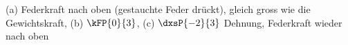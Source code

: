 (a) Federkraft nach oben (gestauchte Feder drückt), gleich gross wie die Gewichtskraft, (b) $\kFP{0}{3}$, (c) $\dxsP{-2}{3}$ Dehnung, Federkraft wieder nach oben
